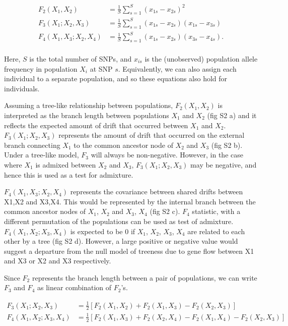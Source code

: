 \documentclass[12pt, letterpaper]{article}
\begin{document}
\begin{align}\label{eq:f_intro}
F_2(X_1,X_2) &= \frac{1}{S}\sum_{s=1}^S(x_{1s} - x_{2s})^2\nonumber\\
F_3(X_1;X_2,X_3) &= \frac{1}{S}\sum_{s=1}^S(x_{1s} - x_{2s})(x_{1s} - x_{3s})\nonumber\\
F_4(X_1,X_3;X_2,X_4) &= \frac{1}{S}\sum_{s=1}^S(x_{1s} - x_{2s})(x_{3s} - x_{4s}).\nonumber\\
\end{align}

Here, $S$ is the total number of SNPs, and $x_{is}$ is the (unobserved) population allele frequency in population $X_i$ at SNP $s$. Equivalently, we can also assign each individual to a separate population, and so these equations also hold for individuals.

Assuming a tree-like relationship between populations, $F_2(X_1,X_2)$ is interpreted as the branch length between populations $X_1$ and $X_2$ (fig S2 a) and it reflects the expected amount of drift that occurred between $X_1$ and $X_2$. $F_3(X_1;X_2,X_3)$ represents the amount of drift that occurred on the external branch connecting $X_1$ to the common ancestor node of $X_2$ and $X_3$ (fig S2 b). Under a tree-like model, $F_3$ will always be non-negative. However, in the case where $X_1$ is admixed between $X_2$ and $X_3$, $F_3(X_1;X_2,X_3)$ may be negative, and hence this is used as a test for admixture\cite{peter_admixture_2016, patterson_ancient_2012}. 

$F_4(X_1,X_3;X_2,X_4)$ represents the covariance between shared drifts between X1,X2 and X3,X4. This would be represented by the internal branch between the common ancestor nodes of $X_1$, $X_2$ and $X_3$, $X_4$ (fig S2 c). $F_4$ statistic, with a different permutation of the populations can be used as test of admixture. $F_4(X_1,X_2;X_3,X_4)$ is expected to be 0 if $X_1$, $X_2$, $X_3$, $X_4$ are related to each other by a tree (fig S2 d). However, a large positive or negative value would suggest a departure from the null model of treeness due to gene flow between X1 and X3 or X2 and X3 respectively.

Since $F_2$ represents the branch length between a pair of populations, we can write $F_3$ and $F_4$ as linear combination of $F_2$'s.

\begin{align}\label{eq:f3_f4}
F_3(X_1;X_2,X_3) &= \frac{1}{2} [F_2(X_1,X_2) + F_2(X_1,X_3) - F_2(X_2,X_3)]\nonumber\\
F_4(X_1,X_2;X_3,X_4) &= \frac{1}{2} [F_2(X_1,X_3) + F_2(X_2,X_4) - F_2(X_1,X_4) - F_2(X_2,X_3)]\nonumber\\
\end{align}
\end{document}
